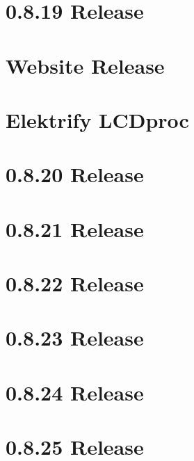 \let\mypdfximage\pdfximage\def\pdfximage{\immediate\mypdfximage}\documentclass[twoside]{book}
\newcommand{\+}{\discretionary{\mbox{\scriptsize$\hookleftarrow$}}{}{}}
\begin{document}
\chapter{0.8.19 Release}
\label{doc_news_2016-11-22_0_8_19_md}

\chapter{Website Release}
\label{doc_news_2016-12-17_website_release_md}

\chapter{Elektrify LCDproc}
\label{doc_news_2017-03-18_lcdproc_md}

\chapter{0.8.20 Release}
\label{doc_news_2017-10-31_0_8_20_md}

\chapter{0.8.21 Release}
\label{doc_news_2017-12-22_0_8_21_md}

\chapter{0.8.22 Release}
\label{doc_news_2018-03-27_0_8_22_md}

\chapter{0.8.23 Release}
\label{doc_news_2018-05-13_0_8_23_md}

\chapter{0.8.24 Release}
\label{doc_news_2018-08-18_0_8_24_md}

\chapter{0.8.25 Release}
\label{doc_news_2018-11-18_0_8_25_md}

\end{document}
